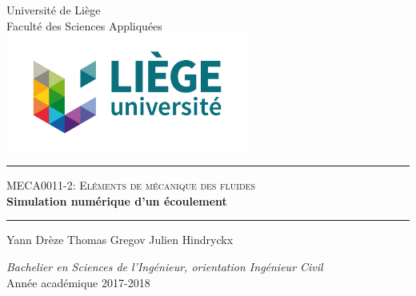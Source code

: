 \documentclass[a4paper,12pt]{article}
\begin{document}
\renewcommand{\contentsname}{Table des matières}
\renewcommand{\listfigurename}{Liste des figures}
\renewcommand{\listtablename}{Liste des tableaux}

\renewcommand{\thesection}{\arabic{section}.}
\renewcommand{\thesubsection}{\arabic{section}.\arabic{subsection}.}
\renewcommand{\thesubsubsection}{\arabic{section}.\arabic{subsection}.\arabic{subsubsection}.}


\thispagestyle{empty}
\begin{center}
	\Large Université de Liège\\
	Faculté des Sciences Appliquées\\
	\vspace{0.5cm}
	\includegraphics[width=8cm]{ulg.jpg}
\end{center}
\vspace*{3cm}
 \begin{center}
	\noindent\rule[0.5ex]{\textwidth}{1pt}
	\textsc{\large MECA0011-2: Eléments de mécanique des fluides}\\
	\vspace*{0.1cm}
	\bfseries \Huge Simulation numérique d'un écoulement
 	\vspace*{-0.6cm}
	\noindent\rule[0.5ex]{\textwidth}{1pt}
\end{center}
\centerline{\large Yann {\sc Drèze}   \quad Thomas {\sc Gregov} \quad Julien {\sc Hindryckx}}
\vfill
\begin{center}
	\large\textsl{Bachelier en Sciences de l'Ingénieur, orientation Ingénieur Civil }\\
	\vspace*{0.5cm}
	Année académique 2017-2018
\end{center}
\pagebreak
\newpage
{}
\fancyhead[R]{}

\doparttoc
\tableofcontents

\newpage
\fancyhead[R]{}
\listoffigures
\listoftables
\newpage
\renewcommand{\sectionmark}[1]{\markboth{#1}{}}
\end{document}
